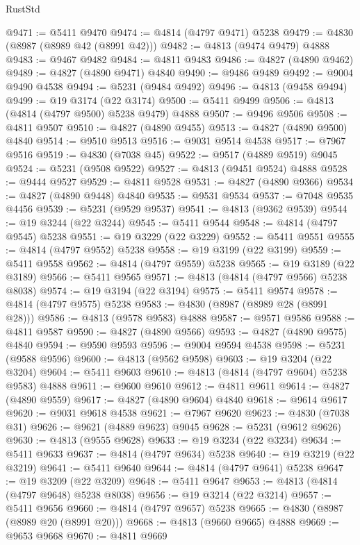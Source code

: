 \begin{lexlean}{RustStd}
\begin{coremodule}
@9471 := @5411 @9470
@9474 := @4814 (@4797 @9471) @5238
@9479 := @4830 (@8987 (@8989 @42 (@8991 @42)))
@9482 := @4813 (@9474 @9479) @4888
@9483 := @9467 @9482
@9484 := @4811 @9483
@9486 := @4827 (@4890 @9462)
@9489 := @4827 (@4890 @9471) @4840
@9490 := @9486 @9489
@9492 := @9004 @9490 @4538
@9494 := @5231 (@9484 @9492)
@9496 := @4813 (@9458 @9494)
@9499 := @19 @3174 (@22 @3174)
@9500 := @5411 @9499
@9506 := @4813 (@4814 (@4797 @9500) @5238 @9479) @4888
@9507 := @9496 @9506
@9508 := @4811 @9507
@9510 := @4827 (@4890 @9455)
@9513 := @4827 (@4890 @9500) @4840
@9514 := @9510 @9513
@9516 := @9031 @9514 @4538
@9517 := @7967 @9516
@9519 := @4830 (@7038 @45)
@9522 := @9517 (@4889 @9519) @9045
@9524 := @5231 (@9508 @9522)
@9527 := @4813 (@9451 @9524) @4888
@9528 := @9444 @9527
@9529 := @4811 @9528
@9531 := @4827 (@4890 @9366)
@9534 := @4827 (@4890 @9448) @4840
@9535 := @9531 @9534
@9537 := @7048 @9535 @4456
@9539 := @5231 (@9529 @9537)
@9541 := @4813 (@9362 @9539)
@9544 := @19 @3244 (@22 @3244)
@9545 := @5411 @9544
@9548 := @4814 (@4797 @9545) @5238
@9551 := @19 @3229 (@22 @3229)
@9552 := @5411 @9551
@9555 := @4814 (@4797 @9552) @5238
@9558 := @19 @3199 (@22 @3199)
@9559 := @5411 @9558
@9562 := @4814 (@4797 @9559) @5238
@9565 := @19 @3189 (@22 @3189)
@9566 := @5411 @9565
@9571 := @4813 (@4814 (@4797 @9566) @5238 @8038)
@9574 := @19 @3194 (@22 @3194)
@9575 := @5411 @9574
@9578 := @4814 (@4797 @9575) @5238
@9583 := @4830 (@8987 (@8989 @28 (@8991 @28)))
@9586 := @4813 (@9578 @9583) @4888
@9587 := @9571 @9586
@9588 := @4811 @9587
@9590 := @4827 (@4890 @9566)
@9593 := @4827 (@4890 @9575) @4840
@9594 := @9590 @9593
@9596 := @9004 @9594 @4538
@9598 := @5231 (@9588 @9596)
@9600 := @4813 (@9562 @9598)
@9603 := @19 @3204 (@22 @3204)
@9604 := @5411 @9603
@9610 := @4813 (@4814 (@4797 @9604) @5238 @9583) @4888
@9611 := @9600 @9610
@9612 := @4811 @9611
@9614 := @4827 (@4890 @9559)
@9617 := @4827 (@4890 @9604) @4840
@9618 := @9614 @9617
@9620 := @9031 @9618 @4538
@9621 := @7967 @9620
@9623 := @4830 (@7038 @31)
@9626 := @9621 (@4889 @9623) @9045
@9628 := @5231 (@9612 @9626)
@9630 := @4813 (@9555 @9628)
@9633 := @19 @3234 (@22 @3234)
@9634 := @5411 @9633
@9637 := @4814 (@4797 @9634) @5238
@9640 := @19 @3219 (@22 @3219)
@9641 := @5411 @9640
@9644 := @4814 (@4797 @9641) @5238
@9647 := @19 @3209 (@22 @3209)
@9648 := @5411 @9647
@9653 := @4813 (@4814 (@4797 @9648) @5238 @8038)
@9656 := @19 @3214 (@22 @3214)
@9657 := @5411 @9656
@9660 := @4814 (@4797 @9657) @5238
@9665 := @4830 (@8987 (@8989 @20 (@8991 @20)))
@9668 := @4813 (@9660 @9665) @4888
@9669 := @9653 @9668
@9670 := @4811 @9669

\end{coremodule}
\end{lexlean}
